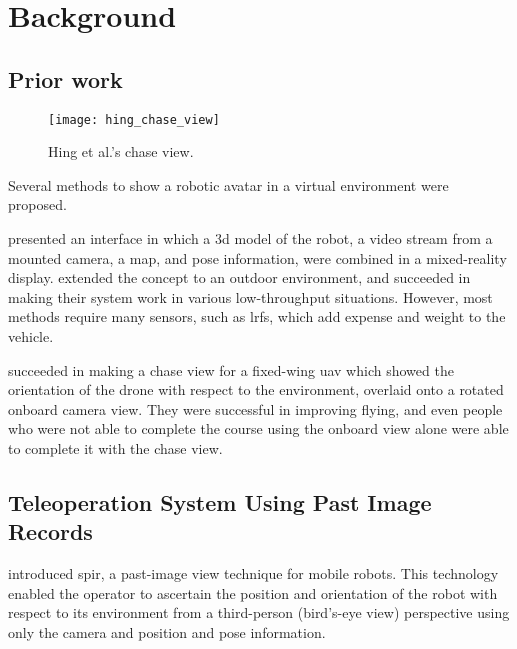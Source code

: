 \chapter{Background}
\label{ch:background}

\section{Prior work}

  \begin{wrapfigure}{r}{0.5\textwidth}
    \centering
    \texttt{[image: hing\_chase\_view]}
    \caption[Hing et al. chase view]{Hing et al.'s chase view.\cite{hing2009}}
    \label{fig:hing_chase_view}
  \end{wrapfigure}

  Several methods to show a robotic avatar in a virtual environment were proposed.

  \textcite{nielsen2007} presented an interface in which a \gls{3d} model of the robot, a video stream from a mounted camera, a map, and pose information, were combined in a mixed-reality display.
  \textcite{kelly2011} extended the concept to an outdoor environment, and succeeded in making their system work in various low-throughput situations.
  However, most methods require many sensors, such as \glspl{lrf}, which add expense and weight to the vehicle.

  \textcite{hing2009} succeeded in making a chase view for a fixed-wing \gls{uav} which showed the orientation of the drone with respect to the environment, overlaid onto a rotated onboard camera view.
  They were successful in improving flying, and even people who were not able to complete the course using the onboard view alone were able to complete it with the chase view.

\section{Teleoperation System Using Past Image Records}
  \textcite{shiroma2004} introduced \gls{spir}, a past-image view technique for mobile robots.
  This technology enabled the operator to ascertain the position and orientation of the robot with respect to its environment from a third-person (bird's-eye view) perspective using only the camera and position and pose information.

